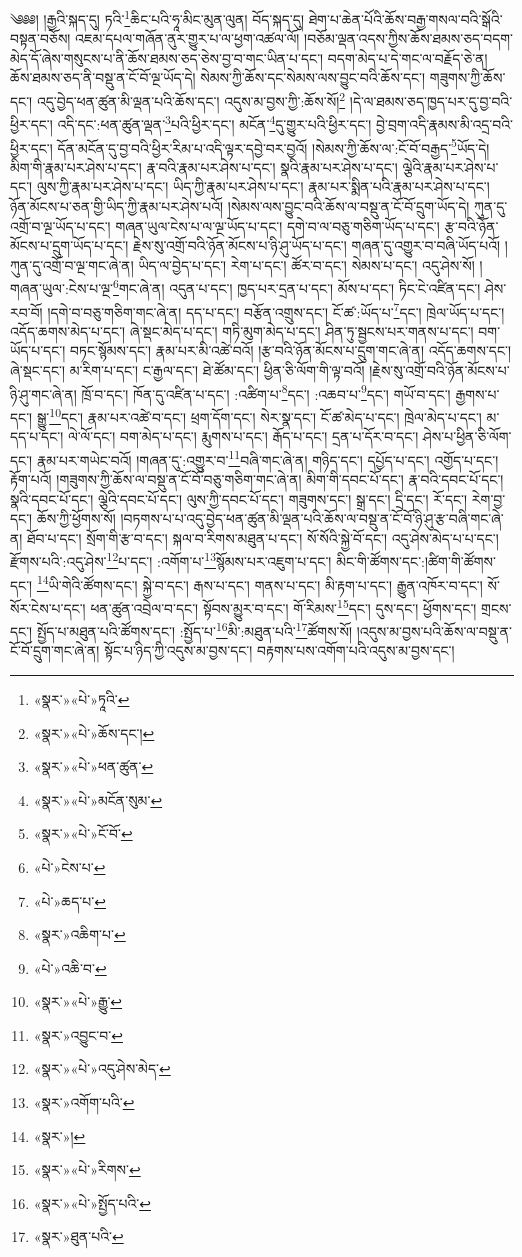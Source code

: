 ༄༅༅། །རྒྱའི་སྐད་དུ། ཏའི་\footnote{«སྣར་»«པེ་»ཏཱའི་}ཆིང་པའི་ཧཱ་མིང་མུན་ལུན། བོད་སྐད་དུ། ཐེག་པ་ཆེན་པོའི་ཆོས་བརྒྱ་གསལ་བའི་སྒོའི་བསྟན་བཅོས། འཇམ་དཔལ་གཞོན་ནུར་གྱུར་པ་ལ་ཕྱག་འཚལ་ལོ། །བཅོམ་ལྡན་འདས་ཀྱིས་ཆོས་ཐམས་ཅད་བདག་མེད་དོ་ཞེས་གསུངས་པ་ནི་ཆོས་ཐམས་ཅད་ཅེས་བྱ་བ་གང་ཡིན་པ་དང་། བདག་མེད་པ་དེ་གང་ལ་བརྗོད་ཅེ་ན། ཆོས་ཐམས་ཅད་ནི་བསྡུ་ན་ངོ་བོ་ལྔ་ཡོད་དེ། སེམས་ཀྱི་ཆོས་དང་སེམས་ལས་བྱུང་བའི་ཆོས་དང་། གཟུགས་ཀྱི་ཆོས་དང་། འདུ་བྱེད་ཕན་ཚུན་མི་ལྡན་པའི་ཆོས་དང་། འདུས་མ་བྱས་ཀྱི་:ཆོས་སོ།\footnote{«སྣར་»«པེ་»ཆོས་དང་།} །དེ་ལ་ཐམས་ཅད་ཁྱད་པར་དུ་བྱ་བའི་ཕྱིར་དང་། འདི་དང་:ཕན་ཚུན་ལྡན་\footnote{«སྣར་»«པེ་»ཕན་ཚུན་}པའི་ཕྱིར་དང་། མངོན་\footnote{«སྣར་»«པེ་»མངོན་སུམ་}དུ་གྱུར་པའི་ཕྱིར་དང་། བྱེ་བྲག་འདི་རྣམས་མི་འདྲ་བའི་ཕྱིར་དང་། དོན་མངོན་དུ་བྱ་བའི་ཕྱིར་རིམ་པ་འདི་ལྟར་དབྱེ་བར་བྱའོ། །སེམས་ཀྱི་ཆོས་ལ་:ངོ་བོ་བརྒྱད་\footnote{«སྣར་»«པེ་»ངོ་བོ་}ཡོད་དེ། མིག་གི་རྣམ་པར་ཤེས་པ་དང་། རྣ་བའི་རྣམ་པར་ཤེས་པ་དང་། སྣའི་རྣམ་པར་ཤེས་པ་དང་། ལྕེའི་རྣམ་པར་ཤེས་པ་དང་། ལུས་ཀྱི་རྣམ་པར་ཤེས་པ་དང་། ཡིད་ཀྱི་རྣམ་པར་ཤེས་པ་དང་། རྣམ་པར་སྨིན་པའི་རྣམ་པར་ཤེས་པ་དང་། ཉོན་མོངས་པ་ཅན་གྱི་ཡིད་ཀྱི་རྣམ་པར་ཤེས་པའོ། །སེམས་ལས་བྱུང་བའི་ཆོས་ལ་བསྡུ་ན་ངོ་བོ་དྲུག་ཡོད་དེ། ཀུན་དུ་འགྲོ་བ་ལྔ་ཡོད་པ་དང་། གཞན་ཡུལ་ངེས་པ་ལ་ལྔ་ཡོད་པ་དང་། དགེ་བ་ལ་བཅུ་གཅིག་ཡོད་པ་དང་། རྩ་བའི་ཉོན་མོངས་པ་དྲུག་ཡོད་པ་དང་། རྗེས་སུ་འགྲོ་བའི་ཉོན་མོངས་པ་ཉི་ཤུ་ཡོད་པ་དང་། གཞན་དུ་འགྱུར་བ་བཞི་ཡོད་པའོ། །ཀུན་དུ་འགྲོ་བ་ལྔ་གང་ཞེ་ན། ཡིད་ལ་བྱེད་པ་དང་། རེག་པ་དང་། ཚོར་བ་དང་། སེམས་པ་དང་། འདུ་ཤེས་སོ། །གཞན་ཡུལ་:ངེས་པ་ལྔ་\footnote{«པེ་»ངེས་པ་}གང་ཞེ་ན། འདུན་པ་དང་། ཁྱད་པར་དྲན་པ་དང་། མོས་པ་དང་། ཏིང་ངེ་འཛིན་དང་། ཤེས་རབ་བོ། །དགེ་བ་བཅུ་གཅིག་གང་ཞེ་ན། དད་པ་དང་། བརྩོན་འགྲུས་དང་། ངོ་ཚ་:ཡོད་པ་\footnote{«པེ་»ཆད་པ་}དང་། ཁྲེལ་ཡོད་པ་དང་། འདོད་ཆགས་མེད་པ་དང་། ཞེ་སྡང་མེད་པ་དང་། གཏི་མུག་མེད་པ་དང་། ཤིན་ཏུ་སྦྱངས་པར་གནས་པ་དང་། བག་ཡོད་པ་དང་། བཏང་སྙོམས་དང་། རྣམ་པར་མི་འཚེ་བའོ། །རྩ་བའི་ཉོན་མོངས་པ་དྲུག་གང་ཞེ་ན། འདོད་ཆགས་དང་། ཞེ་སྡང་དང་། མ་རིག་པ་དང་། ང་རྒྱལ་དང་། ཐེ་ཚོམ་དང་། ཕྱིན་ཅི་ལོག་གི་ལྟ་བའོ། །རྗེས་སུ་འགྲོ་བའི་ཉོན་མོངས་པ་ཉི་ཤུ་གང་ཞེ་ན། ཁྲོ་བ་དང་། ཁོན་དུ་འཛིན་པ་དང་། :འཚིག་པ་\footnote{«སྣར་»འཆིག་པ་}དང་། :འཆབ་པ་\footnote{«པེ་»འཆི་བ་}དང་། གཡོ་བ་དང་། རྒྱགས་པ་དང་། སྒྱུ་\footnote{«སྣར་»«པེ་»རྒྱུ་}དང་། རྣམ་པར་འཚེ་བ་དང་། ཕྲག་དོག་དང་། སེར་སྣ་དང་། ངོ་ཚ་མེད་པ་དང་། ཁྲེལ་མེད་པ་དང་། མ་དད་པ་དང་། ལེ་ལོ་དང་། བག་མེད་པ་དང་། རྨུགས་པ་དང་། རྒོད་པ་དང་། དྲན་པ་དོར་བ་དང་། ཤེས་པ་ཕྱིན་ཅི་ལོག་དང་། རྣམ་པར་གཡེང་བའོ། །གཞན་དུ་:འགྱུར་བ་\footnote{«སྣར་»འབྱུང་བ་}བཞི་གང་ཞེ་ན། གཉིད་དང་། དཔྱོད་པ་དང་། འགྱོད་པ་དང་། རྟོག་པའོ། །གཟུགས་ཀྱི་ཆོས་ལ་བསྡུ་ན་ངོ་བོ་བཅུ་གཅིག་གང་ཞེ་ན། མིག་གི་དབང་པོ་དང་། རྣ་བའི་དབང་པོ་དང་། སྣའི་དབང་པོ་དང་། ལྕེའི་དབང་པོ་དང་། ལུས་ཀྱི་དབང་པོ་དང་། གཟུགས་དང་། སྒྲ་དང་། དྲི་དང་། རོ་དང་། རེག་བྱ་དང་། ཆོས་ཀྱི་ཕྱོགས་སོ། །བཏགས་པ་པ་འདུ་བྱེད་ཕན་ཚུན་མི་ལྡན་པའི་ཆོས་ལ་བསྡུ་ན་ངོ་བོ་ཉི་ཤུ་རྩ་བཞི་གང་ཞེ་ན། ཐོབ་པ་དང་། སྲོག་གི་རྩ་བ་དང་། སྐལ་བ་རིགས་མཐུན་པ་དང་། སོ་སོའི་སྐྱེ་བོ་དང་། འདུ་ཤེས་མེད་པ་པ་དང་། རྫོགས་པའི་:འདུ་ཤེས་\footnote{«སྣར་»«པེ་»འདུ་ཤེས་མེད་}པ་དང་། :འགོག་པ་\footnote{«སྣར་»འགོག་པའི་}སྙོམས་པར་འཇུག་པ་དང་། མིང་གི་ཚོགས་དང་:།ཚིག་གི་ཚོགས་དང་། \footnote{«སྣར་»། }ཡི་གེའི་ཚོགས་དང་། སྐྱེ་བ་དང་། རྒས་པ་དང་། གནས་པ་དང་། མི་རྟག་པ་དང་། རྒྱུན་འཁོར་བ་དང་། སོ་སོར་ངེས་པ་དང་། ཕན་ཚུན་འབྲེལ་བ་དང་། སྟོབས་མྱུར་བ་དང་། གོ་རིམས་\footnote{«སྣར་»«པེ་»རིགས་}དང་། དུས་དང་། ཕྱོགས་དང་། གྲངས་དང་། སྤྱོད་པ་མཐུན་པའི་ཚོགས་དང་། :སྤྱོད་པ་\footnote{«སྣར་»«པེ་»སྤྱོད་པའི་}མི་:མཐུན་པའི་\footnote{«སྣར་»ཐུན་པའི་}ཚོགས་སོ། །འདུས་མ་བྱས་པའི་ཆོས་ལ་བསྡུ་ན་ངོ་བོ་དྲུག་གང་ཞེ་ན། སྟོང་པ་ཉིད་ཀྱི་འདུས་མ་བྱས་དང་། བརྟགས་པས་འགོག་པའི་འདུས་མ་བྱས་དང་། 